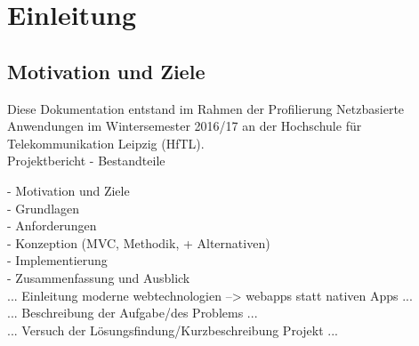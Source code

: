 \chapter{Einleitung}
\section{Motivation und Ziele}

Diese Dokumentation entstand im Rahmen der Profilierung \glqq{}Netzbasierte Anwendungen\grqq{} im Wintersemester 2016/17 an der Hochschule für Telekommunikation Leipzig (HfTL). \\


Projektbericht - Bestandteile

- Motivation und Ziele\\
- Grundlagen \\
- Anforderungen \\  
- Konzeption (MVC, Methodik, + Alternativen) \\
- Implementierung \\
- Zusammenfassung und Ausblick \\


... Einleitung moderne webtechnologien --> webapps statt nativen Apps ... \\
... Beschreibung der Aufgabe/des Problems ...\\

... Versuch der Lösungsfindung/Kurzbeschreibung Projekt ... \\

